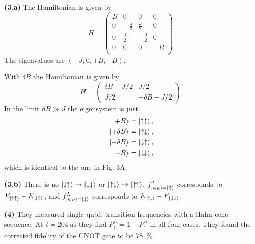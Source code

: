 \documentclass{article}
\makeatletter
\newcommand*{\shifttext}[1]{%
  \settowidth{\@tempdima}{#1}%
  \hspace{-\@tempdima}#1%
}
\newcommand{\plabel}[1]{%
\shifttext{\textbf{#1}\quad}%
}
\newcommand{\prule}{%
\begin{center}%
\hdashrule[0.5ex]{.99\linewidth}{1pt}{1pt 2.5pt}%
\end{center}%
}
\makeatother
\begin{document}
\plabel{(3.a)}%
The Hamiltonian is given by
\[ H = \left(
    \begin{array}{cccc}
     B & 0 & 0 & 0 \\
     0 & -\frac{J}{2} & \frac{J}{2} & 0 \\
     0 & \frac{J}{2} & -\frac{J}{2} & 0 \\
     0 & 0 & 0 & -B \\
    \end{array}
    \right).
\]
The eigenvalues are $(-J,0,+B,-B)$.
\begin{center}
\end{center}
With $\delta B$ the Hamiltonian is given by
\[ H = \begin{pmatrix}
    \delta B - J/2 & J/2 \\
    J/2 & -\delta B - J/2
\end{pmatrix}. \]
In the limit $\delta B \gg J$ the eigensystem is just
\begin{align*}
    \ket{+B} &= \ket{\uparrow\uparrow}, \\
    \ket{+\delta B} &= \ket{\uparrow\downarrow}, \\
    \ket{-\delta B} &= \ket{\downarrow\uparrow}, \\
    \ket{-B} &= \ket{\downarrow\downarrow},
\end{align*}
which is identical to the one in Fig. 3A.

\plabel{(3.b)}%
There is no $\ket{\downarrow\uparrow}\rightarrow \ket{\downarrow\downarrow}$ or $\ket{\uparrow\downarrow} \rightarrow \ket{\uparrow\uparrow}$.
$f^L_{\ket{\psi_R}=\ket{\uparrow}}$ corresponds to $E_{\ket{\uparrow\uparrow}} - E_{\ket{\downarrow\uparrow}}$, and
$f^L_{\ket{\psi_R}=\ket{\downarrow}}$ corresponds to $E_{\ket{\uparrow\downarrow}} - E_{\ket{\downarrow\downarrow}}$.

\plabel{(4)}%
They measured single qubit transition frequencies with a Hahn echo sequence.
At $t = \SI{204}{\nano\second}$ they find $P^L_\uparrow = 1- P^R_\uparrow$ in all four cases.
They found the corrected fidelity of the CNOT gate to be \SI{78}{\percent}.

\prule
\end{document}
